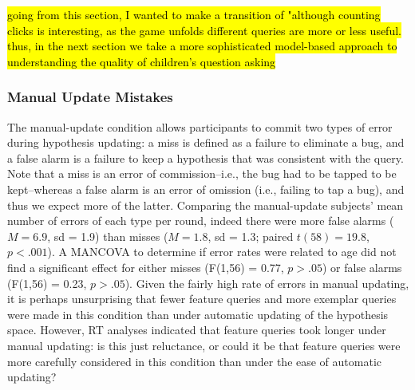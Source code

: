 \documentclass[10pt,letterpaper]{article}
\begin{document}
\hl{going from this section, I wanted to make a transition of "although counting
clicks is interesting, as the game unfolds different queries are more or less useful.
thus, in the next section we take a more sophisticated model-based approach to
understanding the quality of children's question asking}

  \vspace{.05cm}
  

\subsubsection{Manual Update Mistakes}

The manual-update condition allows participants to commit two types of error during 
hypothesis updating: a miss is defined as a failure to eliminate a bug, and a false 
alarm is a failure to keep a hypothesis that was consistent with the query. Note that 
a miss is an error of commission--i.e., the bug had to be tapped to be kept--whereas 
a false alarm is an error of omission (i.e., failing to tap a bug), and thus we expect 
more of the latter. Comparing the manual-update subjects' mean number of errors of 
each type per round, indeed there were more false alarms ($M=6.9$, sd = 1.9) than 
misses ($M=1.8$, sd = 1.3; paired $t(58) = 19.8$, $p<.001$). A MANCOVA to 
determine if error rates were related to age did not find a significant effect for either 
misses (F(1,56) = 0.77, $p>.05$) or false alarms (F(1,56) = 0.23, $p>.05$). Given 
the fairly high rate of errors in manual updating, it is perhaps unsurprising that fewer 
feature queries and more exemplar queries were made in this condition than under 
automatic updating of the hypothesis space. However, RT analyses indicated that 
feature queries took longer under manual updating: is this just reluctance, or could it 
be that feature queries were more carefully considered in this condition than under 
the ease of automatic updating? 
\end{document}
